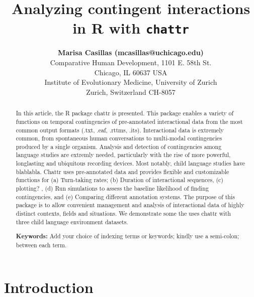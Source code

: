 \documentclass[10pt, letterpaper]{article}
\title{Analyzing contingent interactions in R with \texttt{chattr}}
\author{{\large \bf Marisa Casillas (mcasillas@uchicago.edu)} \\ Comparative Human Development, 1101 E. 58th St. \\ Chicago, IL 60637 USA \AND {\large \bf Camila Scaff (camila.scaff@iem.uzh.ch)} \\ Institute of Evolutionary Medicine, University of Zurich \\ Zurich, Switzerland CH-8057}
\begin{document}
\maketitle

\begin{abstract}
In this article, the R package chattr is presented. This package enables
a variety of functions on temporal contingencies of pre-annotated
interactional data from the most common output formats (.txt, .eaf,
.rttms, .its). Interactional data is extremely common, from spontaneous
human conversations to multi-modal contingencies produced by a single
organism. Analysis and detection of contingencies among language studies
are extremly needed, particularly with the rise of more powerful,
longlasting and ubiquitous recording devices. Most notably, child
language studies have blablabla. Chattr uses pre-annotated data and
provides flexible and customizable functions for (a) Turn-taking rates;
(b) Duration of interactional sequences, (c) plotting? , (d) Run
simulations to assess the baseline likelihood of finding contingencies,
and (e) Comparing different annotation systems. The purpose of this
package is to allow convenient management and analysis of interactional
data of highly distinct contexts, fields and situations. We demonstrate
some the uses chattr with three child language environment datasets.

\textbf{Keywords:}
Add your choice of indexing terms or keywords; kindly use a semi-colon;
between each term.
\end{abstract}

\hypertarget{introduction}{%
\section{Introduction}\label{introduction}}
\end{document}
